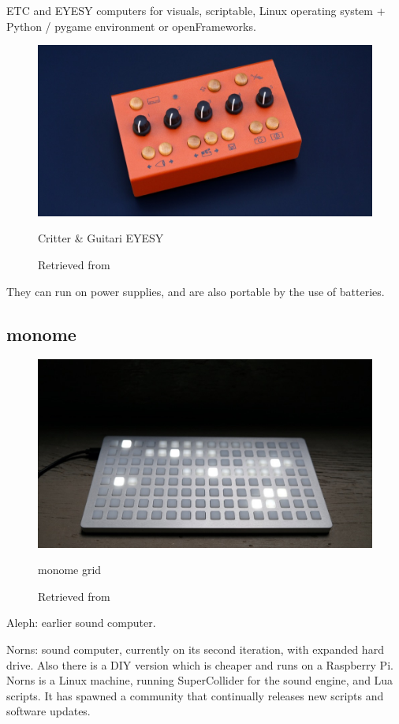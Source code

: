 ETC and EYESY computers for visuals, scriptable, Linux operating system + Python / pygame environment or openFrameworks.

\begin{figure}[ht]
  \centering
  \includegraphics[width=0.75\linewidth,height=0.25\textheight,keepaspectratio]{images/critter-and-guitari-eyesy.jpg}
  \caption{Critter \& Guitari EYESY}
  \caption*{Retrieved from \cite{website-critter-and-guitari-current}}
  \label{fig:critter-and-guitari-eyesy}
\end{figure}

They can run on power supplies, and are also portable by the use of batteries.

\subsection{monome}

\begin{figure}[ht]
  \centering
  \includegraphics[width=0.75\linewidth,height=0.25\textheight,keepaspectratio]{images/monome-grid.jpg}
  \caption{monome grid}
  \caption*{Retrieved from \cite{website-monome-current}}
  \label{fig:monome-grid}
\end{figure}

Aleph: earlier sound computer.

Norns: sound computer, currently on its second iteration, with expanded hard drive. Also there is a \acrshort{DIY} version which is cheaper and runs on a Raspberry Pi.
Norns is a Linux machine, running SuperCollider for the sound engine, and Lua scripts. It has spawned a community that continually releases new scripts and software updates.

